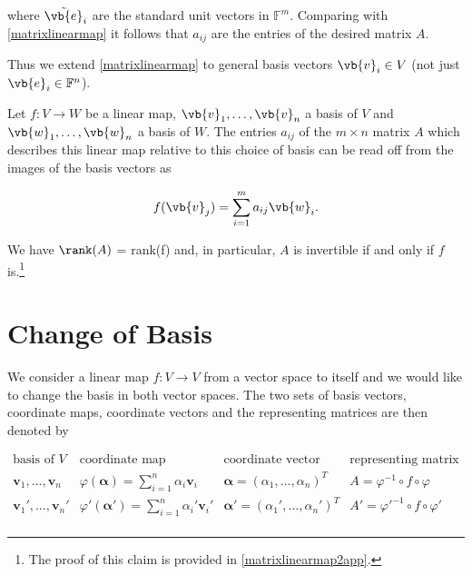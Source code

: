 \documentclass[a4paper,12pt]{report}
\begin{document}
where \(\tilde{\vb{e} }_{i}  \) are the standard unit vectors in \(\mathbb{F}^{m} \). Comparing with \cref{matrixlinearmap} it follows that \(a_{ij} \) are the entries of the desired matrix \(A\).

Thus we extend \cref{matrixlinearmap} to general basis vectors \(\vb{v}_{i}  \in  V\) (not just \(\vb{e} _{i} \in \mathbb{F}^{n}\)).   

\begin{lemma} \label{matrixlinearmap2} 
Let \(f:V \rightarrow W\) be a linear map, \(\vb{v}_{1}, \ldots, \vb{v}_n \) a basis of \(V\) and \(\vb{w}_{1}, \ldots, \vb{w}_n \) a basis of \(W\). The entries \(a_{ij} \) of the \(m \times n\) matrix \(A\) which describes this linear map relative to this choice of basis can be read off from the images of the basis vectors as 

\begin{equation}
    f(\vb{v} _{j} ) = \sum_{i=1}^{m} a_{ij}\vb{w} _{i} . 
\end{equation}

We have \(\rank (A)\) = rank(f) and, in particular, \(A\) is invertible if and only if \(f\) is.\footnote{The proof of this claim is provided in \cref{matrixlinearmap2app}.} 

\end{lemma}

\section{Change of Basis} \label{basischange} 

We consider a linear map \(f:V \rightarrow V\) from a vector space to itself and we would like to change the basis in both vector spaces. The two sets of basis vectors, coordinate maps, coordinate vectors and the representing matrices are then denoted by

\begin{equation}
\begin{array}{cccc}
\text{basis of } V & \text{coordinate map} & \text{coordinate vector} & \text{representing matrix} \\[10pt]
\bm{v}_1, \ldots, \bm{v}_n & \varphi(\boldsymbol{\alpha } ) = \sum_{i=1}^n \alpha_i \bm{v}_i & \bm{\alpha} = (\alpha_1, \ldots, \alpha_n)^T & A = \varphi^{-1} \circ f \circ \varphi \\[15pt]
\bm{v}_1', \ldots, \bm{v}_n' & \varphi'(\boldsymbol{\alpha }' ) = \sum_{i=1}^n \alpha_i' \bm{v}_i' & \bm{\alpha}' = (\alpha_1', \ldots, \alpha_n')^T & A' = \varphi'^{-1} \circ f \circ \varphi' \\[10pt]
\end{array}
\end{equation}
\end{document}
